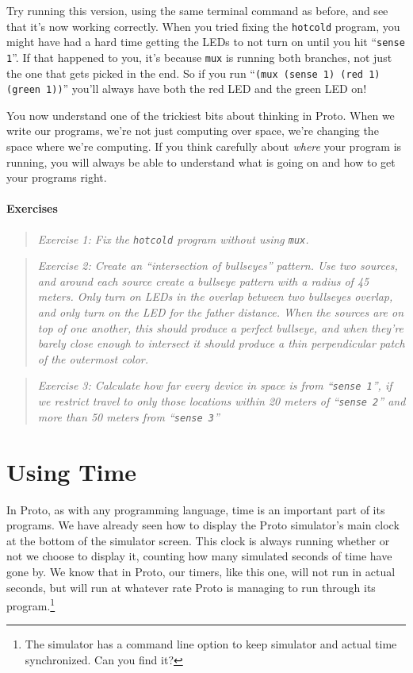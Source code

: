 \documentclass{article}
\newcommand\problem[1]{\begin{quote}{\em #1}\end{quote}}
\newcommand\var[1]{{\tt #1}}
\newcommand\qvar[1]{``{\tt #1}''}
\begin{document}
Try running this version, using the same terminal command as before,
and see that it's now working correctly.  When you tried fixing the
\var{hotcold} program, you might have had a hard time getting the LEDs
to not turn on until you hit \qvar{sense 1}.  If that happened to you,
it's because \var{mux} is running both branches, not just the one that
gets picked in the end.  So if you run \qvar{(mux (sense 1) (red 1)
  (green 1))} you'll always have both the red LED and the green LED
on!

You now understand one of the trickiest bits about thinking in Proto.
When we write our programs, we're not just computing over space, we're
changing the space where we're computing.  If you think carefully
about {\em where} your program is running, you will always be able to
understand what is going on and how to get your programs right.

\paragraph{Exercises}

\problem{Exercise 1: Fix the \var{hotcold} program without using \var{mux}.}

\problem{Exercise 2: Create an ``intersection of bullseyes'' pattern.
  Use two sources, and around each source create a bullseye pattern
  with a radius of 45 meters.  Only turn on LEDs in the overlap
  between two bullseyes overlap, and only turn on the LED for the
  father distance.  When the sources are on top of one another, this
  should produce a perfect bullseye, and when they're barely close
  enough to intersect it should produce a thin perpendicular patch of
  the outermost color.}

\problem{Exercise 3: Calculate how far every device in space is from
  \qvar{sense 1}, if we restrict travel to only those locations within
  20 meters of \qvar{sense 2} and more than 50 meters from \qvar{sense 3}}

\section{Using Time}
\label{s:time}

In Proto, as with any programming language, time is an important part
of its programs.  We have already seen how to display the Proto
simulator's main clock at the bottom of the simulator screen.  This
clock is always running whether or not we choose to display it,
counting how many simulated seconds of time have gone by.  We know
that in Proto, our timers, like this one, will not run in actual
seconds, but will run at whatever rate Proto is managing to run
through its program.\footnote{The simulator has a command line option
  to keep simulator and actual time synchronized.  Can you find it?}
\end{document}
